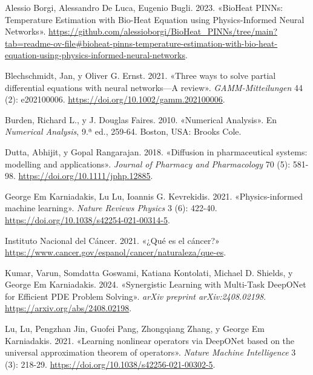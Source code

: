 \documentclass[
  spanish,
  us-letterpaper,
  DIV=11,
  numbers=noendperiod]{scrreprt}
\newlength{\cslhangindent}
\newenvironment{CSLReferences}[2] %
 {\begin{list}{}{%
  \setlength{\itemindent}{0pt}
  \setlength{\leftmargin}{0pt}
  \setlength{\parsep}{0pt}
  \ifodd #1
   \setlength{\leftmargin}{\cslhangindent}
   \setlength{\itemindent}{-1\cslhangindent}
  \fi
  \setlength{\itemsep}{#2\baselineskip}}}
 {\end{list}}
\theoremstyle{plain}
\theoremstyle{definition}
\theoremstyle{remark}
\begin{document}

\label{refs}
\begin{CSLReferences}{1}{0}
Alessio Borgi, Alessandro De Luca, Eugenio Bugli. 2023. {«{BioHeat
PINNs: Temperature Estimation with Bio-Heat Equation using
Physics-Informed Neural Networks}»}.
\url{https://github.com/alessioborgi/BioHeat_PINNs/tree/main?tab=readme-ov-file\#bioheat-pinns-temperature-estimation-with-bio-heat-equation-using-physics-informed-neural-networks}.

Blechschmidt, Jan, y Oliver G. Ernst. 2021. {«Three ways to solve
partial differential equations with neural networks---A review»}.
\emph{GAMM-Mitteilungen} 44 (2): e202100006.
\url{https://doi.org/10.1002/gamm.202100006}.

Burden, Richard L., y J. Douglas Faires. 2010. {«Numerical Analysis»}.
En \emph{Numerical Analysis}, 9.ª ed., 259-64. Boston, USA: Brooks Cole.

Dutta, Abhijit, y Gopal Rangarajan. 2018. {«Diffusion in pharmaceutical
systems: modelling and applications»}. \emph{Journal of Pharmacy and
Pharmacology} 70 (5): 581-98. \url{https://doi.org/10.1111/jphp.12885}.

George Em Karniadakis, Lu Lu, Ioannis G. Kevrekidis. 2021.
{«Physics-informed machine learning»}. \emph{Nature Reviews Physics} 3
(6): 422-40. \url{https://doi.org/10.1038/s42254-021-00314-5}.

Instituto Nacional del Cáncer. 2021. {«{¿Qué es el cáncer?}»}
\url{https://www.cancer.gov/espanol/cancer/naturaleza/que-es}.

Kumar, Varun, Somdatta Goswami, Katiana Kontolati, Michael D. Shields, y
George Em Karniadakis. 2024. {«Synergistic Learning with Multi-Task
DeepONet for Efficient PDE Problem Solving»}. \emph{arXiv preprint
arXiv:2408.02198}. \url{https://arxiv.org/abs/2408.02198}.

Lu, Lu, Pengzhan Jin, Guofei Pang, Zhongqiang Zhang, y George Em
Karniadakis. 2021. {«Learning nonlinear operators via DeepONet based on
the universal approximation theorem of operators»}. \emph{Nature Machine
Intelligence} 3 (3): 218-29.
\url{https://doi.org/10.1038/s42256-021-00302-5}.


\end{CSLReferences}
\end{document}
